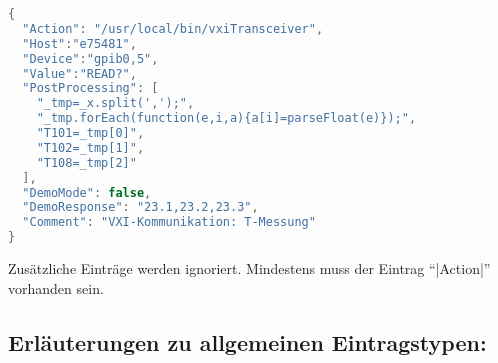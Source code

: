 \documentclass[%
fontsize=11pt
,paper=a4
,twoside
,headings=normal
,pagesize
]{scrartcl}
\begin{document}
\begin{lstlisting}[language=Java]
{
  "Action": "/usr/local/bin/vxiTransceiver",
  "Host":"e75481",
  "Device":"gpib0,5",
  "Value":"READ?",
  "PostProcessing": [
    "_tmp=_x.split(',');",
    "_tmp.forEach(function(e,i,a){a[i]=parseFloat(e)});",
    "T101=_tmp[0]",
    "T102=_tmp[1]",
    "T108=_tmp[2]"
  ],
  "DemoMode": false,
  "DemoResponse": "23.1,23.2,23.3",
  "Comment": "VXI-Kommunikation: T-Messung"
}
\end{lstlisting}

\noindent Zusätzliche Einträge werden ignoriert. Mindestens muss der Eintrag
"`|Action|"' vorhanden sein.

\subsection*{Erläuterungen zu allgemeinen Eintragstypen:}
\end{document}
